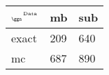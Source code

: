 \begin{tabular}{lll}
    \toprule
    $_{\text{\tiny{\ggn}}}$$^{\text{\tiny{Data}}}$ & mb & sub \\
    \midrule
    exact & 209
              & 640 \\
    mc   & 687
              & 890 \\
    \bottomrule
\end{tabular}